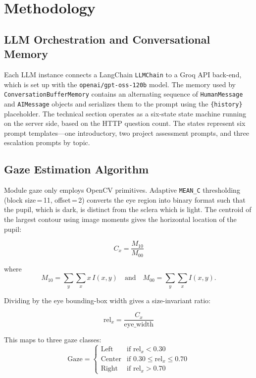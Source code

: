 \documentclass[conference]{IEEEtran}
\begin{document}
\section{Methodology}

\subsection{LLM Orchestration and Conversational Memory}
\label{sec:llm-orch}
Each LLM instance connects a LangChain \texttt{LLMChain} to a Groq API
back-end, which is set up with the \texttt{openai/gpt-oss-120b} model.
The memory used by \texttt{ConversationBufferMemory} contains an
alternating sequence of \texttt{HumanMessage} and \texttt{AIMessage}
objects and serializes them to the prompt using the
\texttt{\{history\}} placeholder. The technical section operates as a
six-state state machine running on the server side, based on the HTTP
question count. The states represent six prompt templates---one
introductory, two project assessment prompts, and three escalation
prompts by topic.

\subsection{Gaze Estimation Algorithm}
\label{sec:gaze}
Module gaze only employs OpenCV primitives. Adaptive \texttt{MEAN\_C}
thresholding (block size\,=\,11, offset\,=\,2) converts the eye region
into binary format such that the pupil, which is dark, is distinct from
the sclera which is light. The centroid of the largest contour using
image moments gives the horizontal location of the pupil:

\begin{equation}
  C_x = \frac{M_{10}}{M_{00}}
  \label{eq:centroid}
\end{equation}

where
\begin{equation}
  M_{10} = \sum_{y}\sum_{x} x\,I(x,y)
  \quad\text{and}\quad
  M_{00} = \sum_{y}\sum_{x} I(x,y).
  \label{eq:moments}
\end{equation}

Dividing by the eye bounding-box width gives a size-invariant ratio:

\begin{equation}
  \mathrm{rel}_x = \frac{C_x}{\text{eye\_width}}
  \label{eq:relx}
\end{equation}

This maps to three gaze classes:
\begin{equation}
  \mathrm{Gaze} =
  \begin{cases}
    \text{Left}   & \text{if } \mathrm{rel}_x < 0.30 \\
    \text{Center} & \text{if } 0.30 \le \mathrm{rel}_x \le 0.70 \\
    \text{Right}  & \text{if } \mathrm{rel}_x > 0.70
  \end{cases}
  \label{eq:gaze-class}
\end{equation}
\end{document}
